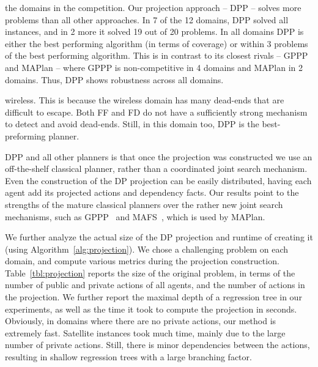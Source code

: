 \documentclass[letterpaper]{article}
\theoremstyle{definition}
\begin{document}
the domains in the competition. Our projection approach -- DPP -- solves more problems than all other approaches. In 7 of the 12 domains, DPP solved all instances, and in 2 more it solved 19 out of 20 problems. In all domains DPP is either the best performing algorithm (in terms of coverage) or within 3 problems of the best performing algorithm. This is in contrast to its closest rivals -- GPPP and MAPlan -- where GPPP is non-competitive in 4 domains and MAPlan in 2 domains. Thus, DPP shows robustness across all domains.


wireless. This is because the wireless domain has many dead-ends that are difficult to escape. Both FF and FD do not have a sufficiently strong mechanism to detect and avoid dead-ends. Still, in this domain too, DPP is the best-preforming planner.

DPP and all other planners is that once the projection was constructed we use an off-the-shelf classical planner, rather than a coordinated joint search mechanism. Even the construction of the DP projection can be easily distributed, having each agent add its projected actions and dependency facts.
Our results point to the strengths of the mature classical planners over the rather new joint search mechanisms, such as GPPP~\cite{maliah2014privacyPreserving} and MAFS~\cite{nissim2014distributed}, which is used by MAPlan.


We further analyze the actual size of the DP projection and runtime of creating it (using Algorithm~\ref{alg:projection}). We chose a challenging problem on each domain, and compute various metrics during the projection construction.  Table~\ref{tbl:projection} reports the size of the original problem, in terms of the number of public and private actions of all agents, and the number of actions in the projection. We further report the maximal depth of a regression tree in our experiments, as well as the time it took to compute the projection in seconds.  Obviously, in domains where there are no private actions, our method is extremely fast.
Satellite instances took much time, mainly due to the large number of private actions. Still, there is minor dependencies between the actions, resulting in shallow regression trees with a large branching factor.
\end{document}

